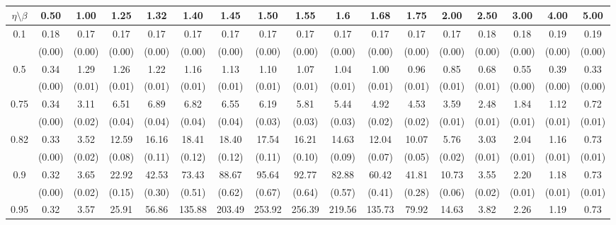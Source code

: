 \documentclass[12pt]{article}  %
\theoremstyle{plain}
\begin{document}
\begin{sidewaystable}[htbp]
\centering
{} 
\label{ATS_10-7}
\ \\
\begin{tabular}{ccccccccccccccccc}
\hline
$\eta \setminus \beta $        & 0.50   & 1.00   & 1.25   & 1.32   & 1.40   & 1.45   & 1.50   & 1.55   & 1.6   & 1.68   & 1.75   & 2.00   & 2.50   & 3.00   & 4.00  &5.00 \\ \hline
\multirow{2}{*}{0.1}  & 0.18 &0.17 & 0.17 & 0.17 &  0.17 &  0.17  & 0.17 &  0.17 &  0.17  & 0.17  & 0.17 & 0.17& 0.18 &0.18 &0.19& 0.19\\
                      & (0.00) & (0.00) & (0.00) & (0.00) & (0.00) & (0.00) & (0.00) & (0.00) & (0.00) & (0.00) & (0.00) & (0.00) & (0.00) & (0.00) & (0.00) & (0.00)\\ \hline
\multirow{2}{*}{0.5}  & 0.34& 1.29 & 1.26 & 1.22  & 1.16 &  1.13  & 1.10  & 1.07  & 1.04 &  1.00  & 0.96 & 0.85 &0.68& 0.55 &0.39& 0.33 \\
                      & (0.00) & (0.01) & (0.01) & (0.01) & (0.01) & (0.01) & (0.01) & (0.01) & (0.01) & (0.01) & (0.01) & (0.01)  & (0.01) & (0.00) & (0.00)&(0.00)\\ \hline
\multirow{2}{*}{0.75}  & 0.34 &3.11 & 6.51 & 6.89  & 6.82 &  6.55  & 6.19 &  5.81  & 5.44 &  4.92 &  4.53 & 3.59& 2.48 &1.84& 1.12& 0.72\\
                      & (0.00)& (0.02)& (0.04)& (0.04)& (0.04)& (0.04)& (0.03)& (0.03)& (0.03)& (0.02)& (0.02)& (0.01)& (0.01)& (0.01)& (0.01) & (0.01)\\ \hline
\multirow{2}{*}{0.82}  & 0.33& 3.52& 12.59& 16.16 & 18.41 & 18.40 & 17.54 & 16.21 & 14.63 & 12.04 & 10.07 & 5.76 &3.03 &2.04& 1.16& 0.73\\
                      & (0.00)& (0.02)& (0.08)& (0.11)& (0.12)& (0.12)& (0.11)& (0.10)& (0.09)& (0.07)& (0.05)& (0.02)&  (0.01)&  (0.01)&  (0.01)& (0.01)\\ \hline
\multirow{2}{*}{0.9}  &0.32& 3.65 &22.92 &42.53 & 73.43 & 88.67 & 95.64 & 92.77 & 82.88  &60.42 & 41.81& 10.73& 3.55& 2.20 &1.18& 0.73\\
                      & (0.00)& (0.02)& (0.15)& (0.30)& (0.51)& (0.62)& (0.67)& (0.64)& (0.57)& (0.41)& (0.28)& (0.06)& (0.02)& (0.01)& (0.01)& (0.01)\\ \hline                                               
\multirow{2}{*}{0.95}  &0.32 &3.57 &25.91& 56.86& 135.88& 203.49& 253.92& 256.39& 219.56 &135.73 & 79.92& 14.63& 3.82& 2.26 &1.19& 0.73\\                

\end{tabular}
\end{sidewaystable}
\end{document}
